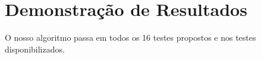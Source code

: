 \documentclass[12pt]{article}
\begin{document}
    \section{Demonstração de Resultados}
    O nosso algoritmo passa em todos os 16 testes propostos e nos testes disponibilizados.


\end{document}
